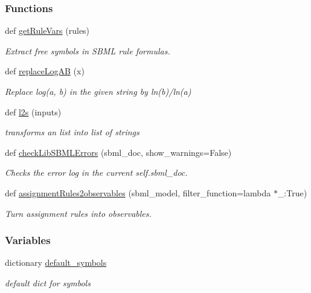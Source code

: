\subsubsection*{Functions}
\begin{DoxyCompactItemize}
\item 
def \mbox{\hyperlink{namespaceamici_1_1sbml__import_a64a5d0187cb4b3f69bceceb7d5638691}{get\+Rule\+Vars}} (rules)
\begin{DoxyCompactList}\small\item\em Extract free symbols in S\+B\+ML rule formulas. \end{DoxyCompactList}\item 
def \mbox{\hyperlink{namespaceamici_1_1sbml__import_a178c633ce1bc7f2af378ce56bd404541}{replace\+Log\+AB}} (x)
\begin{DoxyCompactList}\small\item\em Replace log(a, b) in the given string by ln(b)/ln(a) \end{DoxyCompactList}\item 
def \mbox{\hyperlink{namespaceamici_1_1sbml__import_a6bff3fedaa877c35e5ea7bc112ec4adf}{l2s}} (inputs)
\begin{DoxyCompactList}\small\item\em transforms an list into list of strings \end{DoxyCompactList}\item 
def \mbox{\hyperlink{namespaceamici_1_1sbml__import_ade50d6eafb9bcd9f1f6f13d08b0a3910}{check\+Lib\+S\+B\+M\+L\+Errors}} (sbml\+\_\+doc, show\+\_\+warnings=False)
\begin{DoxyCompactList}\small\item\em Checks the error log in the current self.\+sbml\+\_\+doc. \end{DoxyCompactList}\item 
def \mbox{\hyperlink{namespaceamici_1_1sbml__import_aaba72ac8b7d363e7720f36495ccc3285}{assignment\+Rules2observables}} (sbml\+\_\+model, filter\+\_\+function=lambda $\ast$\+\_\+\+:\+True)
\begin{DoxyCompactList}\small\item\em Turn assignment rules into observables. \end{DoxyCompactList}\end{DoxyCompactItemize}
\subsubsection*{Variables}
\begin{DoxyCompactItemize}
\item 
dictionary \mbox{\hyperlink{namespaceamici_1_1sbml__import_abfb00dffe8d5c524c2916febc9b3810b}{default\+\_\+symbols}}
\begin{DoxyCompactList}\small\item\em default dict for symbols \end{DoxyCompactList}\end{DoxyCompactItemize}


